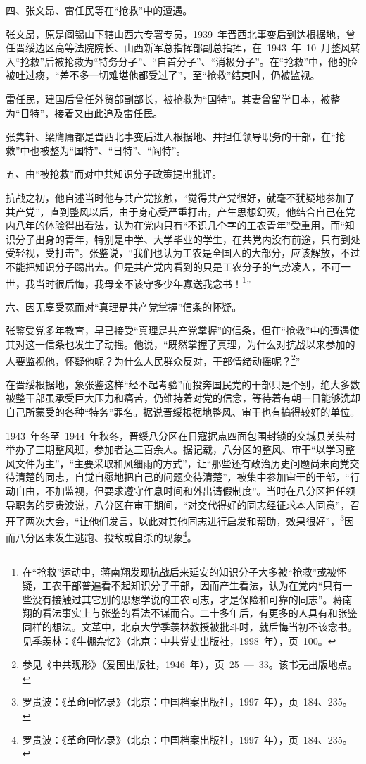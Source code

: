 四、张文昂、雷任民等在“抢救”中的遭遇。

张文昂，原是阎锡山下辖山西六专署专员，1939~年晋西北事变后到达根据地，曾任晋绥边区高等法院院长、山西新军总指挥部副总指挥，在~1943~年~10~月整风转入“抢救”后被抢救为“特务分子”、“自首分子”、“消极分子”。在“抢救”中，他的脸被吐过痰，“差不多一切难堪他都受过了”，至“抢救”结束时，仍被监视。

雷任民，建国后曾任外贸部副部长，被抢救为“国特”。其妻曾留学日本，被整为“日特”，接着又由此追及雷任民。

张隽轩、梁膺庸都是晋西北事变后进入根据地、并担任领导职务的干部，在“抢救”中也被整为“国特”、“日特”、“阎特”。

五、由“被抢救”而对中共知识分子政策提出批评。

抗战之初，他自述当时他与共产党接触，“觉得共产党很好，就毫不犹疑地参加了共产党”，直到整风以后，由于身心受严重打击，产生思想幻灭，他结合自己在党内八年的体验得出看法，认为在党内只有“不识几个字的工农青年”受重用，而“知识分子出身的青年，特别是中学、大学毕业的学生，在共党内没有前途，只有到处受轻视，受打击”。张鉴说，“我们也认为工农是全国人的大部分，应该解放，不过不能把知识分子踢出去。但是共产党内看到的只是工农分子的气势凌人，不可一世，我当时很后悔，我母亲不该守多少年寡送我念书！\footnote{在“抢救”运动中，蒋南翔发现抗战后来延安的知识分子大多被“抢救”或被怀疑，工农干部普遍看不起知识分子干部，因而产生看法，认为在党内“只有一些没有接触过其它别的思想学说的工农同志，才是保险和可靠的同志”。蒋南翔的看法事实上与张鉴的看法不谋而合。二十多年后，有更多的人具有和张鉴同样的想法。文革中，北京大学季羡林教授被批斗时，就后悔当初不该念书。见季羡林：《牛棚杂忆》（北京：中共党史出版社，1998~年），页~100。}”

六、因无辜受冤而对“真理是共产党掌握”信条的怀疑。

张鉴受党多年教育，早已接受“真理是共产党掌握”的信条，但在“抢救”中的遭遇使其对这一信条也发生了动摇。他说，“既然掌握了真理，为什么对抗战以来参加的人要监视他，怀疑他呢？为什么人民群众反对，干部情绪动摇呢？\footnote{参见《中共现形》（爱国出版社，1946~年），页~25~—~33。该书无出版地点。}”

在晋绥根据地，象张鉴这样“经不起考验”而投奔国民党的干部只是个别，绝大多数被整干部虽承受巨大压力和痛苦，仍维持着对党的信念，等待着有朝一日能够洗却自己所蒙受的各种“特务”罪名。据说晋绥根据地整风、审干也有搞得较好的单位。

1943~年冬至~1944~年秋冬，晋绥八分区在日寇据点四面包围封锁的交城县关头村举办了三期整风班，参加者达三百余人。据记载，八分区的整风、审干“以学习整风文件为主”，“主要采取和风细雨的方式”，让“那些还有政治历史问题尚未向党交待清楚的同志，自觉自愿地把自己的问题交待清楚”，被集中参加审干的干部，“行动自由，不加监视，但要求遵守作息时间和外出请假制度”。当时在八分区担任领导职务的罗贵波说，八分区在审干期间，“对交代得好的同志经征求本人同意”，召开了两次大会，“让他们发言，以此对其他同志进行启发和帮助，效果很好”，\footnote{罗贵波：《革命回忆录》（北京：中国档案出版社，1997~年），页~184、235。}因而八分区未发生逃跑、投敌或自杀的现象\footnote{罗贵波：《革命回忆录》（北京：中国档案出版社，1997~年），页~184、235。}。


